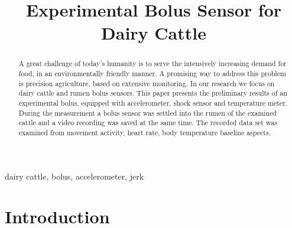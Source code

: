 \documentclass[conference]{IEEEtran}
\begin{document}
\title{Experimental Bolus Sensor for Dairy Cattle\\
}

\author{
\and
{}
\and
{}
}

\maketitle

\begin{abstract}
  A great challenge of today's humanity is to serve the intensively
  increasing demand for food, in an environmentally friendly manner.
  A promising way to address this problem is precision agriculture,
  based on extensive monitoring. In our research we focus on dairy
  cattle and rumen bolus sensors. This paper presents the preliminary
  results of an experimental bolus, equipped with accelerometer,
  shock sensor and temperature meter. During the measurement a bolus sensor was settled into the rumen of the examined cattle and a video recording was saved at the same time. The recorded data set was examined from movement activity, heart rate, body temperature baseline aspects.
\end{abstract}

\begin{IEEEkeywords}
  dairy cattle, bolus, accelerometer, jerk
\end{IEEEkeywords}

\section{Introduction}
\end{document}

